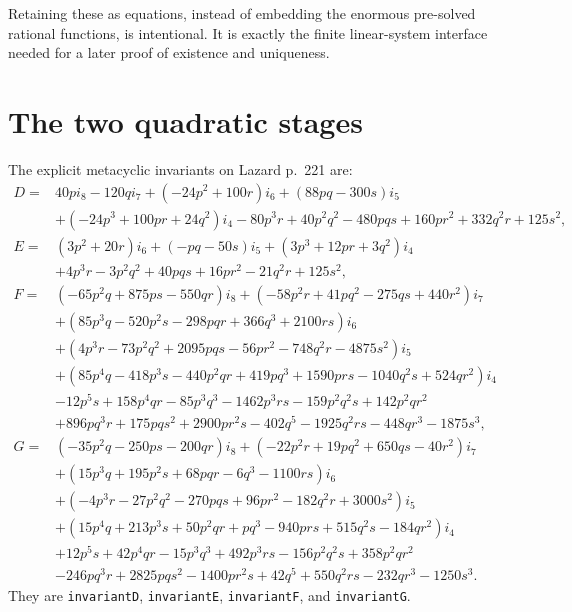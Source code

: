 \documentclass[11pt,a4paper,oneside]{article}
\newcommand{\lean}[1]{\nolinkurl{#1}}
\newcommand{\ii}[1]{i_{#1}}
\begin{document}
Retaining these as equations, instead of embedding the enormous pre-solved
rational functions, is intentional.  It is exactly the finite linear-system
interface needed for a later proof of existence and uniqueness.

\section{The two quadratic stages}

The explicit metacyclic invariants on Lazard p.~221 are:
\begin{align*}
D={}&40p\ii8-120q\ii7+(-24p^2+100r)\ii6+(88pq-300s)\ii5\\
&+(-24p^3+100pr+24q^2)\ii4-80p^3r+40p^2q^2-480pqs
 +160pr^2+332q^2r+125s^2,\\
E={}&(3p^2+20r)\ii6+(-pq-50s)\ii5+(3p^3+12pr+3q^2)\ii4\\
&+4p^3r-3p^2q^2+40pqs+16pr^2-21q^2r+125s^2,\\
F={}&(-65p^2q+875ps-550qr)\ii8+(-58p^2r+41pq^2-275qs+440r^2)\ii7\\
&+(85p^3q-520p^2s-298pqr+366q^3+2100rs)\ii6\\
&+(4p^3r-73p^2q^2+2095pqs-56pr^2-748q^2r-4875s^2)\ii5\\
&+(85p^4q-418p^3s-440p^2qr+419pq^3+1590prs-1040q^2s+524qr^2)\ii4\\
&-12p^5s+158p^4qr-85p^3q^3-1462p^3rs-159p^2q^2s
 +142p^2qr^2\\
&+896pq^3r+175pqs^2+2900pr^2s-402q^5-1925q^2rs-448qr^3-1875s^3,\\
G={}&(-35p^2q-250ps-200qr)\ii8+(-22p^2r+19pq^2+650qs-40r^2)\ii7\\
&+(15p^3q+195p^2s+68pqr-6q^3-1100rs)\ii6\\
&+(-4p^3r-27p^2q^2-270pqs+96pr^2-182q^2r+3000s^2)\ii5\\
&+(15p^4q+213p^3s+50p^2qr+pq^3-940prs+515q^2s-184qr^2)\ii4\\
&+12p^5s+42p^4qr-15p^3q^3+492p^3rs-156p^2q^2s+358p^2qr^2\\
&-246pq^3r+2825pqs^2-1400pr^2s+42q^5+550q^2rs-232qr^3-1250s^3.
\end{align*}
They are \lean{invariantD}, \lean{invariantE}, \lean{invariantF}, and
\lean{invariantG}.
\end{document}

